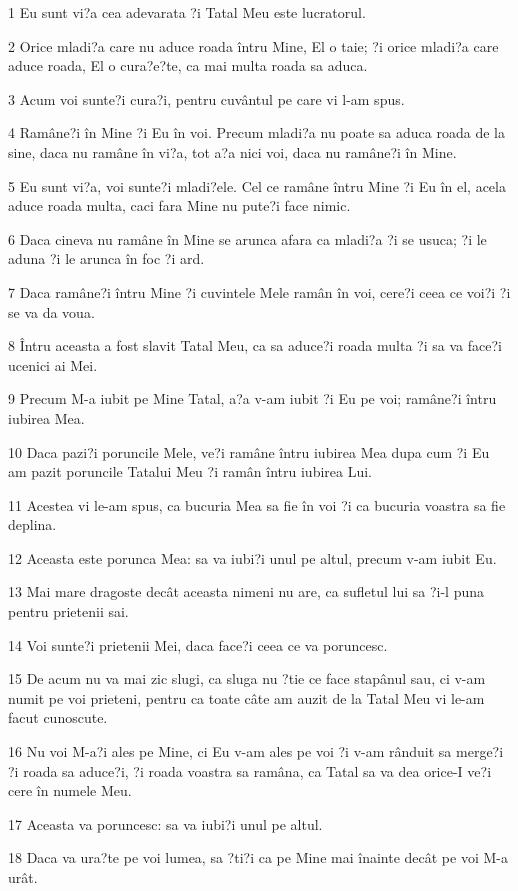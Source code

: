 \par 1 Eu sunt vi?a cea adevarata ?i Tatal Meu este lucratorul.
\par 2 Orice mladi?a care nu aduce roada întru Mine, El o taie; ?i orice mladi?a care aduce roada, El o cura?e?te, ca mai multa roada sa aduca.
\par 3 Acum voi sunte?i cura?i, pentru cuvântul pe care vi l-am spus.
\par 4 Ramâne?i în Mine ?i Eu în voi. Precum mladi?a nu poate sa aduca roada de la sine, daca nu ramâne în vi?a, tot a?a nici voi, daca nu ramâne?i în Mine.
\par 5 Eu sunt vi?a, voi sunte?i mladi?ele. Cel ce ramâne întru Mine ?i Eu în el, acela aduce roada multa, caci fara Mine nu pute?i face nimic.
\par 6 Daca cineva nu ramâne în Mine se arunca afara ca mladi?a ?i se usuca; ?i le aduna ?i le arunca în foc ?i ard.
\par 7 Daca ramâne?i întru Mine ?i cuvintele Mele ramân în voi, cere?i ceea ce voi?i ?i se va da voua.
\par 8 Întru aceasta a fost slavit Tatal Meu, ca sa aduce?i roada multa ?i sa va face?i ucenici ai Mei.
\par 9 Precum M-a iubit pe Mine Tatal, a?a v-am iubit ?i Eu pe voi; ramâne?i întru iubirea Mea.
\par 10 Daca pazi?i poruncile Mele, ve?i ramâne întru iubirea Mea dupa cum ?i Eu am pazit poruncile Tatalui Meu ?i ramân întru iubirea Lui.
\par 11 Acestea vi le-am spus, ca bucuria Mea sa fie în voi ?i ca bucuria voastra sa fie deplina.
\par 12 Aceasta este porunca Mea: sa va iubi?i unul pe altul, precum v-am iubit Eu.
\par 13 Mai mare dragoste decât aceasta nimeni nu are, ca sufletul lui sa ?i-l puna pentru prietenii sai.
\par 14 Voi sunte?i prietenii Mei, daca face?i ceea ce va poruncesc.
\par 15 De acum nu va mai zic slugi, ca sluga nu ?tie ce face stapânul sau, ci v-am numit pe voi prieteni, pentru ca toate câte am auzit de la Tatal Meu vi le-am facut cunoscute.
\par 16 Nu voi M-a?i ales pe Mine, ci Eu v-am ales pe voi ?i v-am rânduit sa merge?i ?i roada sa aduce?i, ?i roada voastra sa ramâna, ca Tatal sa va dea orice-I ve?i cere în numele Meu.
\par 17 Aceasta va poruncesc: sa va iubi?i unul pe altul.
\par 18 Daca va ura?te pe voi lumea, sa ?ti?i ca pe Mine mai înainte decât pe voi M-a urât.
